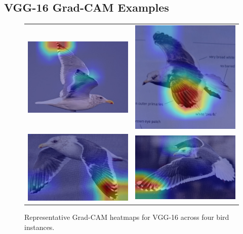 \documentclass[a4paper,12pt]{report}
\begin{document}
\subsection{VGG-16 Grad-CAM Examples}
\begin{figure}[htbp]
  \centering
  \begin{tabular}{cc}
    \includegraphics[width=0.45\linewidth]{images/interpretability/vgg/bird1.jpg} &
    \includegraphics[width=0.45\linewidth]{images/interpretability/vgg/bird2.jpg} \\[0.5em]
    \includegraphics[width=0.45\linewidth]{images/interpretability/vgg/bird3.jpg} &
    \includegraphics[width=0.45\linewidth]{images/interpretability/vgg/bird4.jpg}
  \end{tabular}
  \caption{Representative Grad-CAM heatmaps for VGG-16 across four bird instances.}
  \label{fig:vgg16_gradcam}
\end{figure}
\end{document}
